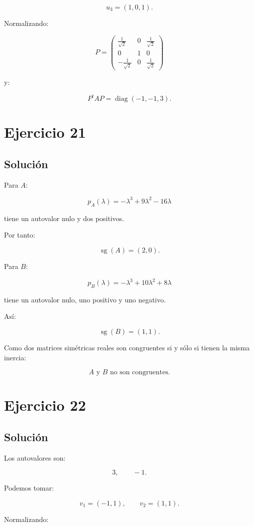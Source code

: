 \documentclass[11pt,a4paper]{article}
\newcommand{\diag}{\operatorname{diag}}
\newcommand{\sg}{\operatorname{sg}}
\begin{document}
\[
u_3=(1,0,1).
\]

Normalizando:

\[
\boxed{
P=
\begin{pmatrix}
\frac1{\sqrt2}&0&\frac1{\sqrt2}\\
0&1&0\\
-\frac1{\sqrt2}&0&\frac1{\sqrt2}
\end{pmatrix}
}
\]

y:

\[
\boxed{
P^tAP
=
\diag(-1,-1,3).
}
\]

\section{Ejercicio 21}
\subsection{Solución}

Para $A$:

\[
p_A(\lambda)
=
-\lambda^3+9\lambda^2-16\lambda
\]

tiene un autovalor nulo y dos positivos.

Por tanto:

\[
\sg(A)=(2,0).
\]

Para $B$:

\[
p_B(\lambda)
=
-\lambda^3+10\lambda^2+8\lambda
\]

tiene un autovalor nulo, uno positivo y uno negativo.

Así:

\[
\sg(B)=(1,1).
\]

Como dos matrices simétricas reales son congruentes si y sólo si tienen la misma inercia:

\[
\boxed{
A\text{ y }B\text{ no son congruentes}.
}
\]

\section{Ejercicio 22}
\subsection{Solución}

Los autovalores son:

\[
3,
\qquad
-1.
\]

Podemos tomar:

\[
v_1=(-1,1),
\qquad
v_2=(1,1).
\]

Normalizando:
\end{document}
